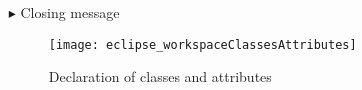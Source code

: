 \begin{itemize}
\vspace{0.5cm}

\item[$\blacktriangleright$] Closing message

\newpage

\vspace*{3cm}

\begin{figure}[htbp]
	\centering
  \texttt{[image: eclipse\_workspaceClassesAttributes]}
	\caption{Declaration of classes and attributes}
	\label{fig:workspaceClassAttributes}
\end{figure} 


\end{itemize}
